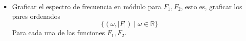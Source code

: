 \documentclass[12pt,a4paper]{report}
\begin{document}
\begin{enumerate}[label=\alph*),left=0pt]
\begin {itemize}[left=0pt]
\begin{figure}[h!]
\begin{minipage}{0.45\textwidth}
            \caption{Espectro de frecuencia en fase para $x_2$}
            \label{fig:imagen2}
          \end{minipage}
        \end{figure}

        \textbf{Reflexionar:} ¿El espectro de frecuencia en fase es discreto o continuo? ¿El gráfico admite una simetría
        par, impar o ninguna?\\

        En ambos casos, el espectro de la frecuencia en fase es una señal de tiempo continuo y admite simetría par.\\

      \item Graficar el espectro de frecuencia en módulo para $F_1, F_2$, esto es, graficar los pares ordenados
        $$\{(\omega, |F|) \mid \omega \in \mathbb{R}\}$$
        Para cada una de las funciones $F_1, F_2$.\newline


\end{itemize}
\end{enumerate}
\end{document}
